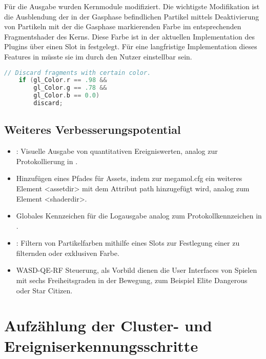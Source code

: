 Für die Ausgabe wurden Kernmodule modifiziert. Die wichtigste Modifikation ist die Ausblendung der in der Gasphase befindlichen Partikel mittels Deaktivierung von Partikeln mit der die Gasphase markierenden Farbe im entsprechenden Fragmentshader des  Kerns. Diese Farbe ist in der aktuellen Implementation des Plugins über einen Slot in \SECalc festgelegt. Für eine langfristige Implementation dieses Features in  müsste sie im  durch den Nutzer einstellbar sein.

\begin{lstlisting}[language=c]
    // Discard fragments with certain color.
    if (gl_Color.r == .98 &&
	    gl_Color.g == .78 &&
	    gl_Color.b == 0.0)
	    discard;
\end{lstlisting}

\subsection*{Weiteres Verbesserungspotential}\label{sec:pluginaufbau-optimierung}

\begin{itemize}
	\item {}: Visuelle Ausgabe von quantitativen Ereigniswerten, analog zur Protokollierung in \SECalc.
	\item Hinzufügen eines Pfades für Assets, indem zur megamol.cfg ein weiteres Element <assetdir> mit dem Attribut path hinzugefügt wird, analog zum Element <shaderdir>.
	\item Globales Kennzeichen für die Logausgabe analog zum Protokollkennzeichen in \SECalc.
	\item {}: Filtern von Partikelfarben mithilfe eines Slots zur Festlegung einer zu filternden oder exklusiven Farbe.
	\item WASD-QE-RF Steuerung, als Vorbild dienen die User Interfaces von Spielen mit sechs Freiheitsgraden in der Bewegung, zum Beispiel Elite Dangerous oder Star Citizen.
\end{itemize}


\section{Aufzählung der Cluster- und Ereigniserkennungsschritte}\label{sec:cluster-ereignis-schritte}

